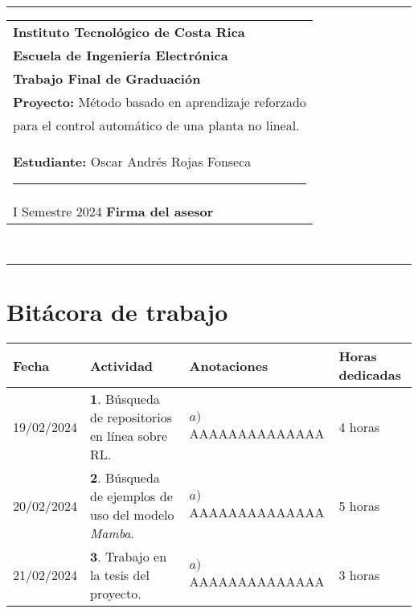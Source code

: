 \documentclass[12pt]{article}
\begin{document}
\hfill\\
\rule{\textwidth}{1.5pt}

\begin{minipage}[t]{85mm}
  \begin{tabular}{l}
    \textbf{\large Instituto Tecnológico de Costa Rica} \\  
    \textbf{Escuela de Ingeniería Electrónica} \\
    \textbf{Trabajo Final de Graduación} \\
    \textbf{Proyecto:} Método basado en aprendizaje reforzado \\para el control automático de una planta no lineal. \\
    \textbf{Estudiante:} Oscar Andrés Rojas Fonseca \hspace{3cm}\rule{4.5cm}{1.5pt}\\
    I Semestre 2024 \hspace{8.5cm}\textbf{Firma del asesor}
  \end{tabular}
\end{minipage}
\hfill\\
\rule{\textwidth}{1.5pt}


\section*{Bitácora de trabajo}

\begin{minipage}[h]{\textwidth}
	\centering
	\begin{tabularx}{\textwidth}{|p{2cm}|X|X|p{2cm}|} 
		\hline
		\rowcolor{encabezado}
		\textbf{Fecha} & 
		\textbf{Actividad} & 
		\textbf{Anotaciones} & 
		\textbf{Horas dedicadas} \\ \hline
		19/02/2024 & 
		$\mathbf{1}.$ Búsqueda de repositorios en línea sobre RL. & 
		$a)$ AAAAAAAAAAAAAA \newline  & 
		4 horas \\
	 	20/02/2024 & 
	 	$\mathbf{2}.$ Búsqueda de ejemplos de uso del modelo \textit{Mamba}. &
	 	$a)$ AAAAAAAAAAAAAA \newline  & 
	 	5 horas \\
	 	21/02/2024 & 
	 	$\mathbf{3}.$ Trabajo en la tesis del proyecto. & 
	 	$a)$ AAAAAAAAAAAAAA \newline  & 
	 	3 horas \\
	 	
	 	\hline
	\end{tabularx}
\end{minipage}	 	
	 	
\end{document}
